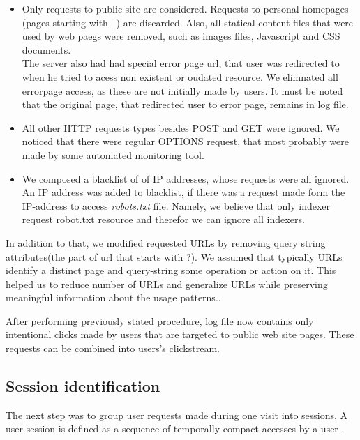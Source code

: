 \documentclass[english,a4paper]{article}
\begin{document}
\begin{itemize}
\item Only requests to public site are considered. Requests to personal homepages (pages starting with ~) are discarded. Also, all statical content files that were used by web paegs were removed, such as images files, Javascript and CSS documents. \\ The server also had had special error page url, that user was redirected to when he tried to acess non existent or oudated resource. We elimnated all errorpage access, as these are not initially made by users. It must be noted that the original page, that redirected user to error page, remains in log file.
  
\item All other HTTP requests types besides POST and GET were ignored. We noticed that there were regular OPTIONS request, that most probably were made by some automated monitoring tool. 
  
\item We composed a blacklist of of IP addresses, whose requests were all ignored. An IP address was added to blacklist, if there was a request made form the IP-address to access \emph{robots.txt} file. Namely, we believe that only indexer request robot.txt resource and therefor we can ignore all indexers.
\end{itemize}


In addition to that, we modified requested URLs by  removing query string attributes(the part of url that starts with ?).  We assumed that typically URLs identify a distinct page and query-string some operation or action on it. This helped us to reduce number of URLs and generalize URLs while preserving meaningful information about the usage patterns..

After performing previously stated procedure, log file now contains only intentional clicks made by users that are targeted to public web site pages. These requests can be combined into users's clickstream.











\subsection{Session identification}
The next step was to group user requests made during one visit into sessions. A user session is defined as a sequence of temporally compact accesses by a user \cite{on_mining_logs}.
\end{document}
